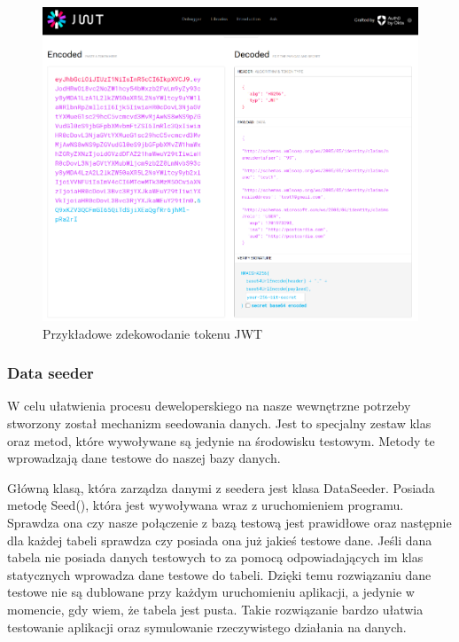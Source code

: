 \documentclass[a4paper,twoside,12pt]{book}
\begin{document}
\begin{figure}[H]
    \centering
    \includegraphics[width=1\textwidth]{jwtdecode.png}
    \caption{Przykładowe zdekowodanie tokenu JWT }
    \label{JWTDecode}
\end{figure}

\subsubsection{Data seeder} 
W celu ułatwienia procesu deweloperskiego na nasze wewnętrzne potrzeby stworzony został mechanizm seedowania danych. Jest to specjalny zestaw klas oraz metod, które wywoływane są jedynie na środowisku testowym. Metody te wprowadzają dane testowe do naszej bazy danych.  

Główną klasą, która zarządza danymi z seedera jest klasa DataSeeder. Posiada metodę Seed(), która jest wywoływana wraz z uruchomieniem programu. Sprawdza ona czy nasze połączenie z bazą testową jest prawidłowe oraz następnie dla każdej tabeli sprawdza czy posiada ona już jakieś testowe dane. Jeśli dana tabela nie posiada danych testowych to za pomocą odpowiadających im klas statycznych wprowadza dane testowe do tabeli. Dzięki temu rozwiązaniu dane testowe nie są dublowane przy każdym uruchomieniu aplikacji, a jedynie w momencie, gdy wiem, że tabela jest pusta. Takie rozwiązanie bardzo ułatwia testowanie aplikacji oraz symulowanie rzeczywistego działania na danych. 
\end{document}

